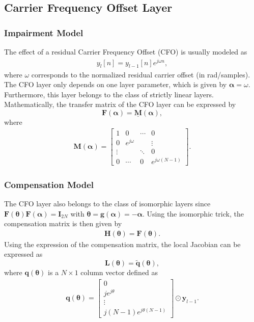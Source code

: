 \documentclass{article}
\begin{document}
\subsection{Carrier Frequency Offset Layer}

\subsubsection{Impairment Model}
The effect of a residual Carrier Frequency Offset (CFO) is usually modeled as \cite{YAO05}
\begin{align}
y_l[n] =y_{l-1}[n]e^{j\omega n},
\end{align}
where $\omega$ corresponds to the normalized residual carrier offset (in rad/samples). The CFO layer only depends on one layer parameter, which is given by $\boldsymbol \alpha=\omega$. Furthermore, this layer belongs to the class of strictly linear layers. Mathematically, the transfer matrix of the CFO layer can be expressed by 
$$
\mathbf{F}(\boldsymbol \alpha)=\underline{\mathbf{M}}(\boldsymbol \alpha),
$$
where
\begin{align}
\mathbf{M}(\boldsymbol\alpha)= 
\begin{bmatrix}
1 & 0 &\cdots & 0 \\
0 & e^{j \omega} &  &\vdots\\
 \vdots& & \ddots& 0\\
0&\cdots&0&e^{j \omega(N-1)}
\end{bmatrix}.
\end{align}
\subsubsection{Compensation Model}
The CFO layer also belongs to the class of isomorphic layers since $
\mathbf{F}(\boldsymbol \theta)\mathbf{F}(\boldsymbol\alpha)=\mathbf{I}_{2N}$ with $ \boldsymbol\theta=\mathbf{g}(\boldsymbol\alpha)=-\boldsymbol\alpha$. Using the isomorphic trick, the compensation matrix is then given by
\begin{align}
\mathbf{H}(\boldsymbol \theta)=\mathbf{F}(\boldsymbol \theta).
\end{align}
Using the expression of the compensation matrix, the local Jacobian can be expressed as
$$
\mathbf{L}(\boldsymbol \theta) = \tilde{\mathbf{q}}(\boldsymbol \theta),
$$
where $\mathbf{q}(\boldsymbol \theta)$ is a $N\times 1$ column vector defined as
\begin{align}
\mathbf{q}(\boldsymbol \theta)= 
 \begin{bmatrix}
0 \\
je^{j \theta} \\
\vdots \\
j(N-1)e^{j \theta(N-1)}
\end{bmatrix}
\odot \mathbf{y}_{l-1}.
\end{align}
\end{document}
